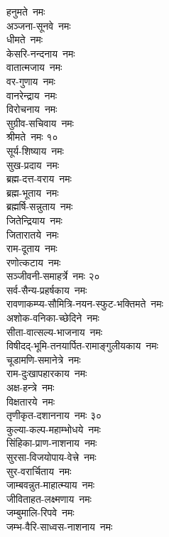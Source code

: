 \begin{multicols}{2}
\begin{flushleft}
हनुमते~नमः\\
अञ्जना-सूनवे~नमः\\
धीमते~नमः\\
केसरि-नन्दनाय~नमः\\
वातात्मजाय~नमः\\
वर-गुणाय~नमः\\
वानरेन्द्राय~नमः \\
विरोचनाय~नमः\\
सुग्रीव-सचिवाय~नमः\\
श्रीमते~नमः \hfill १०\\
सूर्य-शिष्याय~नमः\\
सुख-प्रदाय~नमः \\
ब्रह्म-दत्त-वराय~नमः\\
ब्रह्म-भूताय~नमः\\
ब्रह्मर्षि-सन्नुताय~नमः\\
जितेन्द्रियाय~नमः\\
जितारातये~नमः\\
राम-दूताय~नमः\\
रणोत्कटाय~नमः \\
सञ्जीवनी-समाहर्त्रे~नमः \hfill २०\\
सर्व-सैन्य-प्रहर्षकाय~नमः\\
रावणाकम्प्य-सौमित्रि-नयन-स्फुट-भक्तिमते~नमः\\
अशोक-वनिका-च्छेदिने~नमः\\
सीता-वात्सल्य-भाजनाय~नमः\\
विषीदद्-भूमि-तनयार्पित-रामाङ्गुलीयकाय~नमः\\
चूडामणि-समानेत्रे~नमः\\
राम-दुःखापहारकाय~नमः\\
अक्ष-हन्त्रे~नमः\\
विक्षतारये~नमः\\
तृणीकृत-दशाननाय~नमः \hfill ३०\\
कुल्या-कल्प-महाम्भोधये~नमः\\
सिंहिका-प्राण-नाशनाय~नमः\\
सुरसा-विजयोपाय-वेत्त्रे~नमः\\
सुर-वरार्चिताय~नमः\\
जाम्बवन्नुत-माहात्म्याय~नमः\\
जीविताहत-लक्ष्मणाय~नमः\\
जम्बुमालि-रिपवे~नमः\\
जम्भ-वैरि-साध्वस-नाशनाय~नमः\\

\end{flushleft}
\end{multicols}
